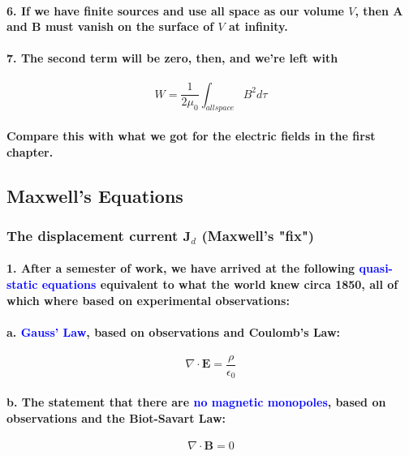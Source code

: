 \documentclass{article}
\begin{document}
\paragraph{6. If we have finite sources and use all space as our volume $V$, then $\boldsymbol{A}$ and $\boldsymbol{B}$ must vanish on the surface of $V$ at infinity.}
\paragraph{7. The second term will be zero, then, and we're left with}
\begin{equation*}
    W=\frac{1}{2\mu_0}\int_{all space}B^2d\tau
\end{equation*}
\paragraph{\indent Compare this with what we got for the electric fields in the first chapter.}
\subsection{Maxwell's Equations}
\subsubsection{The displacement current $\boldsymbol{J}_d$ (Maxwell's "fix")}
\paragraph{1. After a semester of work, we have arrived at the following \textcolor{blue}{quasi-static equations} equivalent to what the world knew circa 1850, all of which where based on experimental observations:}
\paragraph{\indent a. \textcolor{blue}{Gauss' Law}, based on observations and Coulomb's Law:}
\begin{equation*}
    \nabla\cdot\boldsymbol{E}=\frac{\rho}{\epsilon_0}
\end{equation*}
\paragraph{\indent b. The statement that there are \textcolor{blue}{no magnetic monopoles}, based on observations and the Biot-Savart Law:}
\begin{equation*}
    \nabla\cdot\boldsymbol{B}=0
\end{equation*}
\end{document}
